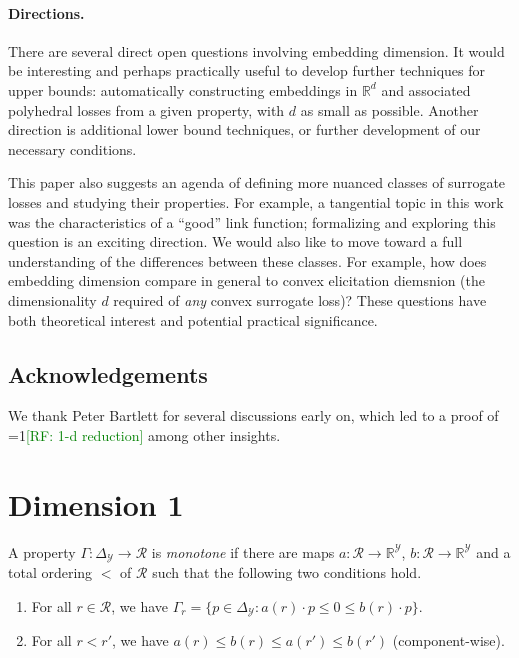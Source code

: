 \documentclass[11pt]{colt2019}
\newcommand{\Comments}{1}
\newcommand{\mynote}[2]{\ifnum\Comments=1\textcolor{#1}{#2}\fi}
\newcommand{\raf}[1]{\mynote{green}{[RF: #1]}}
\newcommand{\reals}{\mathbb{R}}
\newcommand{\simplex}{\Delta_\Y}
\newcommand{\R}{\mathcal{R}}
\newcommand{\Y}{\mathcal{Y}}
\begin{document}
\paragraph{Directions.}
There are several direct open questions involving embedding dimension.
It would be interesting and perhaps practically useful to develop further techniques for upper bounds: automatically constructing embeddings in $\reals^d$ and associated polyhedral losses from a given property, with $d$ as small as possible.
Another direction is additional lower bound techniques, or further development of our necessary conditions.

This paper also suggests an agenda of defining more nuanced classes of surrogate losses and studying their properties.
For example, a tangential topic in this work was the characteristics of a ``good'' link function; formalizing and exploring this question is an exciting direction.
We would also like to move toward a full understanding of the differences between these classes.
For example, how does embedding dimension compare in general to convex elicitation diemsnion (the dimensionality $d$ required of \emph{any} convex surrogate loss)?
These questions have both theoretical interest and potential practical significance.

\subsection*{Acknowledgements}
We thank Peter Bartlett for several discussions early on, which led to a proof of \raf{1-d reduction} among other insights.

\appendix

\section{Dimension 1}\label{app:dimension-1}

\begin{definition}
  A property $\Gamma:\simplex\to\R$ is \emph{monotone} if there are maps $a:\R\to\reals^\Y$, $b:\R\to\reals^\Y$ and a total ordering $<$ of $\R$ such that the following two conditions hold.
  \begin{enumerate}
  \item For all $r\in\R$, we have $\Gamma_r = \{p\in\simplex : a(r) \cdot p \leq 0 \leq b(r) \cdot p\}$.
  \item For all $r < r'$, we have $a(r) \leq b(r) \leq a(r') \leq b(r')$ (component-wise).
  \end{enumerate}
\end{definition}
\end{document}
